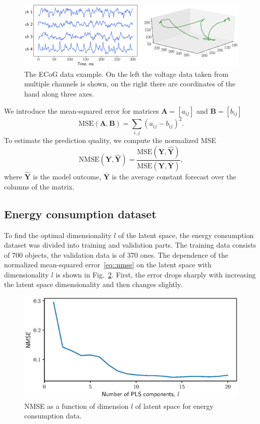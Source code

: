 \documentclass[12pt,twoside]{article}
\newcommand{\bY}{\mathbf{Y}}
\begin{document}
\begin{figure}
	\includegraphics[width=\linewidth]{figs/ecog_data.eps}
	\caption{The ECoG data example. On the left the voltage data taken from multiple channels is shown, on the right there are coordinates of the hand along three axes.}
	\label{fig::ecog_data}
\end{figure}

We introduce the mean-squared error for matrices $\mathbf{A} = [a_{ij}]$ and $\mathbf{B} = [b_{ij}]$ 
\[
\text{MSE} (\mathbf{A}, \mathbf{B}) = \sum_{i,j} (a_{ij} - b_{ij})^2.
\]
To estimate the prediction quality, we compute the normalized MSE 
\begin{equation}
\text{NMSE}(\bY,  \mathbf{\hat{Y}}) = \frac{\text{MSE} (\bY, \mathbf{\hat{Y}})}{\text{MSE} (\bY, \mathbf{\bar{Y}})},
\label{eq::nmse}
\end{equation}
where $\mathbf{\hat{Y}}$ is the model outcome, $\mathbf{\bar{Y}}$ is the average constant forecast over the columns of the matrix.

\subsection{Energy consumption dataset}

To find the optimal dimensionality $l$ of the latent space, the energy consumption dataset was divided into training and validation parts. 
The training data consists of $700$ objects, the validation data is of $370$ ones. The dependence of the normalized mean-squared error~\eqref{eq::nmse} on the latent space with dimensionality $l$ is shown in Fig.~\ref{fig::energy_n_comp}. 
First, the error drops sharply with increasing the latent space dimensionality and then changes slightly.

\begin{figure}[!h]
	\centering
	\includegraphics[width=0.75\linewidth]{figs/energy_n_comp}
	\caption{NMSE as a function of dimension $l$ of latent space for energy consumption data.}
	\label{fig::energy_n_comp}
\end{figure}
\end{document}
